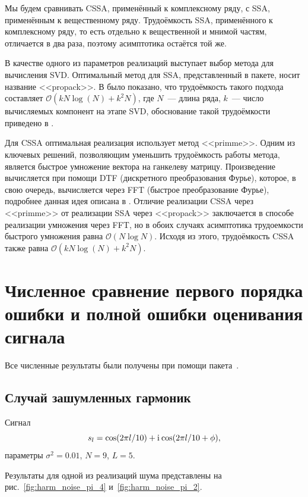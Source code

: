 \documentclass[specialist,
               substylefile = spbu.rtx,
               subf,href,colorlinks=true, 12pt]{disser}
\begin{document}
Мы будем сравнивать CSSA, применённый к комплексному ряду, с SSA, применённым к вещественному ряду. Трудоёмкость SSA, применённого к комплексному ряду, то есть отдельно к вещественной и мнимой частям, отличается в два раза, поэтому асимптотика остаётся той же.

В качестве одного из параметров реализаций выступает выбор метода для вычисления SVD. Оптимальный метод для SSA, представленный в пакете, носит название <<propack>>. В \cite{Golyandina.etal2018} было показано, что трудоёмкость такого подхода составляет $\mathcal{O}(k N \log(N) + k^2 N)$, где $N$~--- длина ряда, $k$~--- число вычисляемых компонент на этапе SVD, обоснование такой трудоёмкости приведено в \cite{Korobeynikov2010}.

Для CSSA оптимальная реализация использует метод <<primme>>. Одним из ключевых решений, позволяющим уменьшить трудоёмкость работы метода, является быстрое умножение вектора на ганкелеву матрицу. Произведение вычисляется при помощи DTF (дискретного преобразования Фурье), которое, в свою очередь, вычисляется через FFT (быстрое преобразование Фурье), подробнее данная идея описана в \cite{Korobeynikov2010}. Отличие реализации CSSA через <<primme>> от реализации SSA через <<propack>> заключается в способе реализации умножения через FFT, но в обоих случаях асимптотика трудоемкости быстрого умножения равна $\mathcal{O}(N \log N)$. Исходя из этого, трудоёмкость CSSA также равна $\mathcal{O}(k N \log(N) + k^2 N)$.

\section{Численное сравнение первого порядка ошибки и полной ошибки оценивания сигнала}
\label{sec:results}

Все численные результаты были получены при помощи пакета~\cite{Korobeynikov.etal2014}.

\subsection{Случай зашумленных гармоник}
Сигнал
$$s_l = \cos(2 \pi l / 10) + \mathrm{i}\mkern1mu\cos(2 \pi l / 10 + \phi),$$
параметры $\sigma^2 = 0.01$, $N = 9$, $L = 5$.

Результаты для одной из реализаций шума представлены на рис.~\ref{fig:harm_noise_pi_4} и~\ref{fig:harm_noise_pi_2}.
\end{document}
